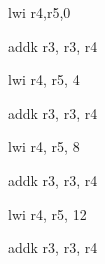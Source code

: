 lwi r4,r5,0

addk r3, r3, r4

lwi r4, r5, 4

addk r3, r3, r4

lwi r4, r5, 8

addk r3, r3, r4

lwi r4, r5, 12

addk r3, r3, r4
